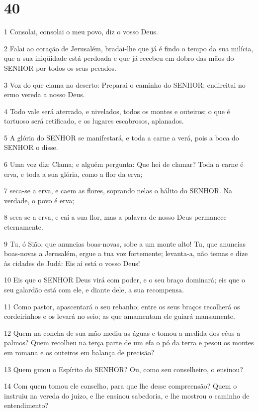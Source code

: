 \chapter{40}

\par 1 Consolai, consolai o meu povo, diz o vosso Deus.
\par 2 Falai ao coração de Jerusalém, bradai-lhe que já é findo o tempo da sua milícia, que a sua iniqüidade está perdoada e que já recebeu em dobro das mãos do SENHOR por todos os seus pecados.
\par 3 Voz do que clama no deserto: Preparai o caminho do SENHOR; endireitai no ermo vereda a nosso Deus.
\par 4 Todo vale será aterrado, e nivelados, todos os montes e outeiros; o que é tortuoso será retificado, e os lugares escabrosos, aplanados.
\par 5 A glória do SENHOR se manifestará, e toda a carne a verá, pois a boca do SENHOR o disse.
\par 6 Uma voz diz: Clama; e alguém pergunta: Que hei de clamar? Toda a carne é erva, e toda a sua glória, como a flor da erva;
\par 7 seca-se a erva, e caem as flores, soprando nelas o hálito do SENHOR. Na verdade, o povo é erva;
\par 8 seca-se a erva, e cai a sua flor, mas a palavra de nosso Deus permanece eternamente.
\par 9 Tu, ó Sião, que anuncias boas-novas, sobe a um monte alto! Tu, que anuncias boas-novas a Jerusalém, ergue a tua voz fortemente; levanta-a, não temas e dize às cidades de Judá: Eis aí está o vosso Deus!
\par 10 Eis que o SENHOR Deus virá com poder, e o seu braço dominará; eis que o seu galardão está com ele, e diante dele, a sua recompensa.
\par 11 Como pastor, apascentará o seu rebanho; entre os seus braços recolherá os cordeirinhos e os levará no seio; as que amamentam ele guiará mansamente.
\par 12 Quem na concha de sua mão mediu as águas e tomou a medida dos céus a palmos? Quem recolheu na terça parte de um efa o pó da terra e pesou os montes em romana e os outeiros em balança de precisão?
\par 13 Quem guiou o Espírito do SENHOR? Ou, como seu conselheiro, o ensinou?
\par 14 Com quem tomou ele conselho, para que lhe desse compreensão? Quem o instruiu na vereda do juízo, e lhe ensinou sabedoria, e lhe mostrou o caminho de entendimento?
